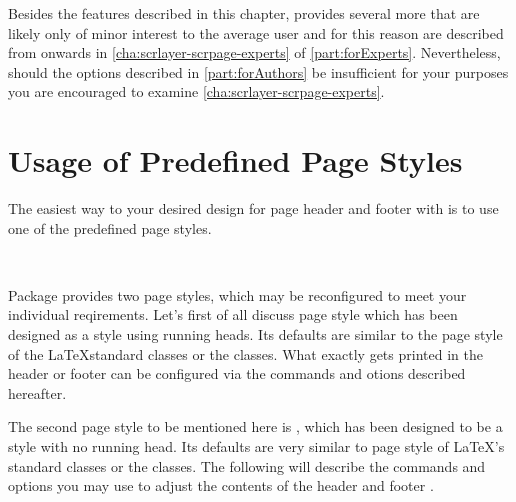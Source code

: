 Besides the features described in this chapter, 
provides several more that are likely only of minor interest to the average
user and for this reason are described from 
 onwards in
\autoref{cha:scrlayer-scrpage-experts} of \autoref{part:forExperts}.
Nevertheless, should the options described in \autoref{part:forAuthors} be
insufficient for your purposes you are encouraged to examine
\autoref{cha:scrlayer-scrpage-experts}.



\section{Usage of Predefined Page Styles}
\label{sec:scrlayer-scrpage.predefined.pagestyles}

The easiest way to your desired design for page header and footer with
 is to use one of the predefined page styles.

\begin{Declaration}
  \\
\end{Declaration}
%
%
Package  provides two page styles, which may be
reconfigured to meet your individual reqirements. Let's first of all discuss
page style  which has been designed as a style using
running heads. Its defaults are similar to the page style
 of the \LaTeX standard classes
or the \KOMAScript{} classes. What exactly gets printed in the header or
footer can be configured via the commands and otions described hereafter.

The second page style to be mentioned here is ,
which has been designed to be a style with no running head. Its defaults are
very similar to page style  of \LaTeX's
standard classes or the \KOMAScript{} classes. The following will describe the
commands and options you may use to adjust the contents of the header and
footer .

